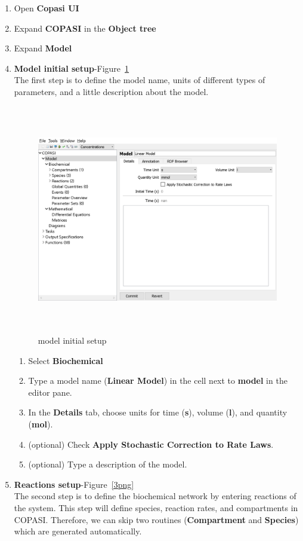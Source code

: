 \documentclass[10pt]{article}
\theoremstyle{definition}
\theoremstyle{remark}
\begin{document}
	\begin{enumerate}\def\makelabel{\textbf{Step}~}
		\item Open \textbf{Copasi UI}
		\item Expand \textbf{COPASI} in the \textbf{Object tree}
		\item Expand \textbf{Model}\\
		\item {\Large\textbf{Model initial setup}}-Figure~\ref{2png}\\
		The first step is to define the model name, units of different types of parameters, and a little description about the model.
		\begin{figure}[!htb]
			\centering
			\includegraphics[height=10cm]{Images/2.png}    
			\caption{model initial setup}
			\label{2png}
		\end{figure}
		\begin{enumerate}
			\item Select \textbf{Biochemical}
			\item Type a model name (\textbf{Linear Model}) in the cell next to \textbf{model} in the editor pane.
			\item In the \textbf{Details} tab, choose units for time (\textbf{s}), volume (\textbf{l}), and quantity (\textbf{mol}).
			\item (optional) Check \textbf{Apply Stochastic Correction to Rate Laws}.
			\item (optional) Type a description of the model.\\
		\end{enumerate}
		\item {\Large\textbf{Reactions setup}}-Figure~\ref{3png}\\
		The second step is to define the biochemical network by entering reactions of the system. This step will define species, reaction rates, and compartments in COPASI. Therefore, we can skip two routines (\textbf{Compartment} and \textbf{Species}) which are generated automatically.
		

\end{enumerate}
\end{document}
